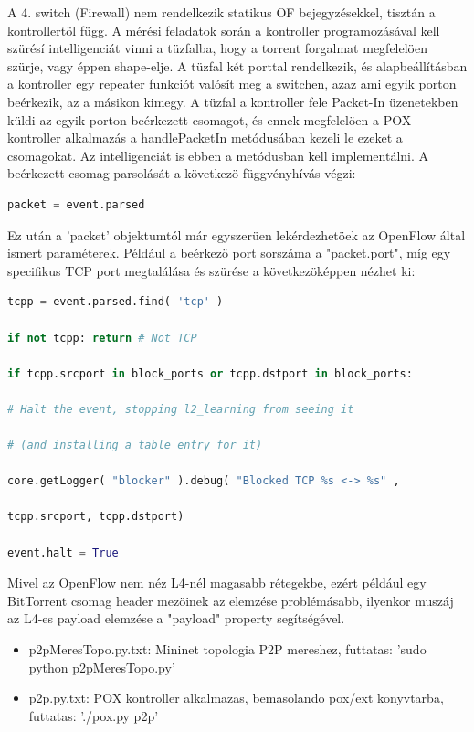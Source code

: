 \documentclass[a4paper]{article}
\begin{document}
A 4. switch (Firewall) nem rendelkezik statikus OF bejegyzésekkel, tisztán a kontrollertöl függ. A mérési feladatok során a kontroller programozásával kell szürésí intelligenciát vinni a tüzfalba, hogy a torrent forgalmat megfelelöen szürje, vagy éppen shape-elje. A tüzfal két porttal rendelkezik, és alapbeállításban a kontroller egy repeater funkciót valósít meg a switchen, azaz ami egyik porton beérkezik, az a másikon kimegy. A tüzfal a kontroller fele Packet-In üzenetekben küldi az egyik porton beérkezett csomagot, és ennek megfelelöen a POX kontroller alkalmazás a handlePacketIn metódusában kezeli le ezeket a csomagokat. Az intelligenciát is ebben a metódusban kell implementálni. A beérkezett csomag parsolását a következö függvényhívás végzi:
\begin{lstlisting}[language=python,frame=single,breaklines]
packet = event.parsed  
\end{lstlisting}

Ez után a 'packet' objektumtól már egyszerüen lekérdezhetöek az OpenFlow által ismert paraméterek. Például a beérkezö port sorszáma a "packet.port", míg egy specifikus TCP port megtalálása és szürése a következöképpen nézhet ki:

\begin{lstlisting}[language=python,frame=single,breaklines]
tcpp = event.parsed.find( 'tcp' )

if not tcpp: return # Not TCP

if tcpp.srcport in block_ports or tcpp.dstport in block_ports:

# Halt the event, stopping l2_learning from seeing it

# (and installing a table entry for it)

core.getLogger( "blocker" ).debug( "Blocked TCP %s <-> %s" ,

tcpp.srcport, tcpp.dstport)

event.halt = True
\end{lstlisting}

Mivel az OpenFlow nem néz L4-nél magasabb rétegekbe, ezért például egy BitTorrent csomag header mezöinek az elemzése problémásabb, ilyenkor muszáj az L4-es payload elemzése a "payload" property segítségével.

\appendix

\begin{itemize}

	\item p2pMeresTopo.py.txt: Mininet topologia P2P mereshez, futtatas: 'sudo python p2pMeresTopo.py'

	\item p2p.py.txt: POX kontroller alkalmazas, bemasolando pox/ext konyvtarba, futtatas: './pox.py p2p'
\end{itemize}
\end{document}
